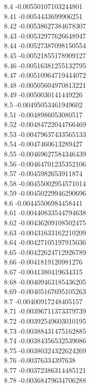 {8.4	-0.00550107103244801\\
8.41	-0.0054433699906251\\
8.42	-0.00538627384678307\\
8.43	-0.00532977626648947\\
8.44	-0.00527387098150554\\
8.45	-0.00521855178909127\\
8.46	-0.00516381255132795\\
8.47	-0.00510964719444072\\
8.48	-0.00505604970813221\\
8.49	-0.0050030141449226\\
8.5	-0.00495053461949602\\
8.51	-0.0048986053080517\\
8.52	-0.00484722044766469\\
8.53	-0.00479637433565133\\
8.54	-0.0047460613289427\\
8.55	-0.00469627584346439\\
8.56	-0.00464701235352106\\
8.57	-0.0045982653911874\\
8.58	-0.00455002954571014\\
8.59	-0.00450229946290696\\
8.6	-0.00445506984458441\\
8.61	-0.00440833544794638\\
8.62	-0.00436209108502475\\
8.63	-0.00431633162210209\\
8.64	-0.00427105197915036\\
8.65	-0.00422624712926789\\
8.66	-0.0041819120981276\\
8.67	-0.0041380419634315\\
8.68	-0.00409463185436205\\
8.69	-0.00405167695105263\\
8.7	-0.00400917248405157\\
8.71	-0.00396711373379739\\
8.72	-0.00392549603010195\\
8.73	-0.00388431475162885\\
8.74	-0.00384356532539086\\
8.75	-0.00380324322624269\\
8.76	-0.00376334397638\\
8.77	-0.00372386314485121\\
8.78	-0.00368479634706288\\
}

